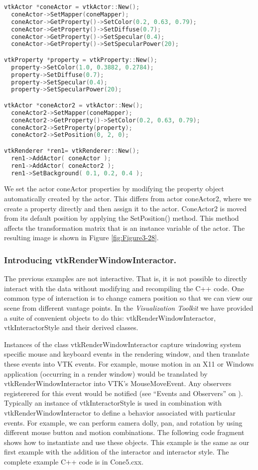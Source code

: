 \begin{lstlisting}[language=C++, caption={Cone4.cxx}]
vtkActor *coneActor = vtkActor::New();
  coneActor->SetMapper(coneMapper);
  coneActor->GetProperty()->SetColor(0.2, 0.63, 0.79);
  coneActor->GetProperty()->SetDiffuse(0.7);
  coneActor->GetProperty()->SetSpecular(0.4);
  coneActor->GetProperty()->SetSpecularPower(20);

vtkProperty *property = vtkProperty::New();
  property->SetColor(1.0, 0.3882, 0.2784);
  property->SetDiffuse(0.7);
  property->SetSpecular(0.4);
  property->SetSpecularPower(20);

vtkActor *coneActor2 = vtkActor::New();
  coneActor2->SetMapper(coneMapper);
  coneActor2->GetProperty()->SetColor(0.2, 0.63, 0.79);
  coneActor2->SetProperty(property);
  coneActor2->SetPosition(0, 2, 0);

vtkRenderer *ren1= vtkRenderer::New();
  ren1->AddActor( coneActor );
  ren1->AddActor( coneActor2 );
  ren1->SetBackground( 0.1, 0.2, 0.4 );
\end{lstlisting}

We set the actor coneActor properties by modifying the property object automatically created by the actor. This differs from actor coneActor2, where we create a property directly and then assign it to the actor. ConeActor2 is moved from its default position by applying the SetPosition() method. This method affects the transformation matrix that is an instance variable of the actor. The resulting image is shown in Figure \ref{fig:Figure3-28}.

\subsubsection{Introducing vtkRenderWindowInteractor.}
\label{pg:rwi}

The previous examples are not interactive. That is, it is not possible to directly interact with the data without modifying and recompiling the C++ code. One common type of interaction is to change camera position so that we can view our scene from different vantage points. In the \emph{Visualization Toolkit} we have provided a suite of convenient objects to do this: vtkRenderWindowInteractor, vtkInteractorStyle and their derived classes.

Instances of the class vtkRenderWindowInteractor capture windowing system specific mouse and keyboard events in the rendering window, and then translate these events into VTK events. For example, mouse motion in an X11 or Windows application (occurring in a render window) would be translated by vtkRenderWindowInteractor into VTK's MouseMoveEvent. Any observers registerered for this event would be notified (see ``Events and Observers'' on \pageref{sub:events_obdervers} ). Typically an instance of vtkInteractorStyle is used in combination with vtkRenderWindowInteractor to define a behavior associated with particular events. For example, we can perform camera dolly, pan, and rotation by using different mouse button and motion combinations. The following code fragment shows how to instantiate and use these objects. This example is the same as our first example with the addition of the interactor and interactor style. The complete example C++ code is in Cone5.cxx.

